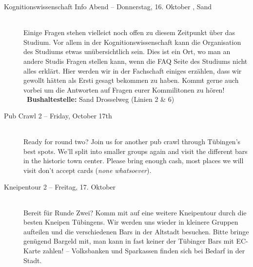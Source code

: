 \begin{description}
\ifkogwiss
	\item[Kognitionswissenschaft Info Abend -- Donnerstag, 16. Oktober \YEAR, Sand]~\\%
	Einige Fragen stehen vielleict noch offen zu diesem Zeitpunkt über das Studium. 
	Vor allem in der Kognitionswissenschaft kann die Organisation des Studiums etwas unübersichtlich sein. 
	Dies ist ein Ort, wo man an andere Studis Fragen stellen kann, wenn die FAQ Seite des Studiums nicht alles erklärt.
	Hier werden wir in der Fachschaft einiges erzählen, dass wir gewollt hätten als Ersti gesagt bekommen zu haben.
	Kommt gerne auch vorbei um die Antworten auf Fragen eurer Kommilitonen zu hören!
	~\textbf{Bushaltestelle:} Sand Drosselweg (Linien 2 \& 6)
\fi


\ifml
	\item[Pub Crawl 2 -- Friday, October 17th \YEAR]~\\
	Ready for round two? Join us for another pub crawl through Tübingen's best spots.
	We'll split into smaller groups again and visit the different bars in the historic town center.
	Please bring enough cash, most places we will visit don't accept cards (\emph{none whatsoever}).
\else
	\item[Kneipentour 2 -- Freitag, 17. Oktober \YEAR]~\\
	Bereit für Runde Zwei? Komm mit auf eine weitere Kneipentour durch die besten Kneipen Tübingens.
	Wir werden uns wieder in kleinere Gruppen aufteilen und die verschiedenen Bars in der Altstadt besuchen.
	Bitte bringe genügend Bargeld mit, man kann in fast keiner der Tübinger Bars mit EC-Karte zahlen! -- Volksbanken und Sparkassen 	finden sich bei Bedarf in der Stadt.
\fi

\ifbachelor \pagebreak \fi
\ifmaster \ifinfo \iflehramt \else \pagebreak \fi \fi \fi
\ifmaster \ifmedien \pagebreak \fi \fi
\ifmaster \ifmedinfo \pagebreak \fi \fi
\ifmaster \ifkogwiss \pagebreak \fi \fi


\end{description}

